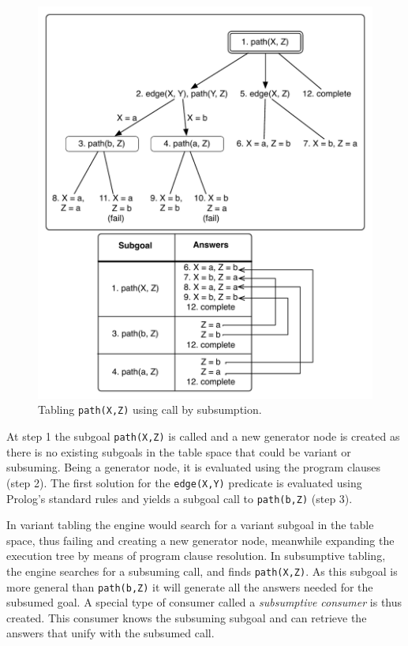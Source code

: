 \begin{figure}[ht]
\centering
  \includegraphics[scale=0.6]{tabling_path_sub.pdf}
\caption{Tabling \texttt{path(X,Z)} using call by subsumption.}
\label{fig:tabling_path_sub}
\end{figure}

At step 1 the subgoal \texttt{path(X,Z)} is called and a new generator node is created as there is no existing subgoals
in the table space that could be variant or subsuming. Being a generator node, it is evaluated using the program clauses
(step 2). The first solution for the \texttt{edge(X,Y)} predicate is evaluated using Prolog's standard rules and yields
a subgoal call to \texttt{path(b,Z)} (step 3).

In variant tabling the engine would search for a variant subgoal in the table space, thus failing and creating a
new generator node, meanwhile expanding the execution tree by means of program clause resolution. In subsumptive
tabling, the engine searches for a subsuming call, and finds \texttt{path(X,Z)}. As this subgoal is more general than
\texttt{path(b,Z)} it will generate all the answers needed for the subsumed goal. A special type of consumer called a
\textit{subsumptive consumer} is thus created. This consumer knows the subsuming subgoal and can retrieve the answers
that unify with the subsumed call.

